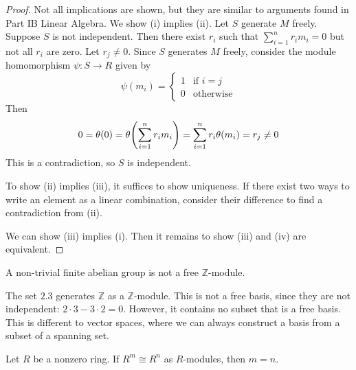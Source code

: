 \begin{proof}
	Not all implications are shown, but they are similar to arguments found in Part IB Linear Algebra.
	We show (i) implies (ii).
	Let \( S \) generate \( M \) freely.
	Suppose \( S \) is not independent.
	Then there exist \( r_i \) such that \( \sum_{i=1}^n r_i m_i = 0 \) but not all \( r_i \) are zero.
	Let \( r_j \neq 0 \).
	Since \( S \) generates \( M \) freely, consider the module homomorphism \( \psi \colon S \to R \) given by
	\[
		\psi(m_i) = \begin{cases}
			1 & \text{if } i = j \\
			0 & \text{otherwise}
		\end{cases}
	\]
	Then
	\[
		0 = \theta(0) = \theta\qty(\sum_{i=1}^n r_i m_i) = \sum_{i=1}^n r_i \theta(m_i) = r_j \neq 0
	\]
	This is a contradiction, so \( S \) is independent.

	To show (ii) implies (iii), it suffices to show uniqueness.
	If there exist two ways to write an element as a linear combination, consider their difference to find a contradiction from (ii).

	We can show (iii) implies (i).
	Then it remains to show (iii) and (iv) are equivalent.
\end{proof}
\begin{example}
	A non-trivial finite abelian group is not a free \( \mathbb Z \)-module.

	The set \( \qty{2,3} \) generates \( \mathbb Z \) as a \( \mathbb Z \)-module.
	This is not a free basis, since they are not independent: \( 2 \cdot 3 - 3 \cdot 2 = 0 \).
	However, it contains no subset that is a free basis.
	This is different to vector spaces, where we can always construct a basis from a subset of a spanning set.
\end{example}
\begin{proposition}
	Let \( R \) be a nonzero ring.
	If \( R^m \cong R^n \) as \( R \)-modules, then \( m = n \).
\end{proposition}
